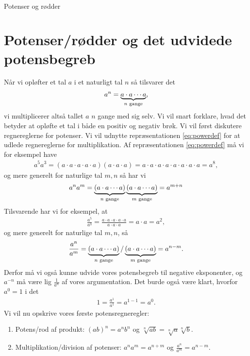 

\begin{center}
\Huge
Potenser og rødder
\end{center}


\section*{Potenser/rødder og det udvidede potensbegreb}

Når vi opløfter et tal $a$ i et naturligt tal $n$ så tilsvarer det
\begin{align}\label{eq:powerdef}
a^n = \underbrace{a\cdot a \cdots a}_{n\textnormal{ gange}},
\end{align}
vi multiplicerer altså tallet $a$ $n$ gange med sig selv. Vi vil snart forklare, hvad det betyder at opløfte et tal i både en positiv og negativ brøk. Vi vil først diskutere regnereglerne for potenser. Vi vil udnytte repræsentationen \eqref{eq:powerdef} for at udlede regnereglerne for multiplikation.
Af repræsentationen \eqref{eq:powerdef} må vi for eksempel have
\begin{align*}
a^5a^3 = (a\cdot a\cdot a\cdot a\cdot a)(a\cdot a\cdot a) = a\cdot a\cdot a\cdot a\cdot a\cdot a\cdot a\cdot a = a^8, 
\end{align*}
og mere generelt for naturlige tal $m,n$ så har vi
\begin{align*}
a^na^m = \underbrace{(a\cdot a\cdots a)}_{n \textnormal{ gange}}\underbrace{(a\cdot a\cdots a)}_{m \textnormal{ gange}} = a^{m+n}
\end{align*}
Tilsvarende har vi for eksempel, at 
\begin{align*}
\frac{a^5}{a^3} = \frac{a\cdot a\cdot a\cdot a\cdot a}{a\cdot a\cdot a} = a\cdot a =a^2,
\end{align*}
og mere generelt for naturlige tal $m,n$, så
\begin{align*}
\frac{a^n}{a^m} = \underbrace{(a \cdot a \cdots a)}_{n\textnormal{ gange}}/\underbrace{(a \cdot a \cdots a)}_{m\textnormal{ gange}} = a^{n-m}.
\end{align*}
Derfor må vi også kunne udvide vores potensbegreb til negative eksponenter, og $a^{-n}$ må være lig $\frac{1}{a^n}$ af vores argumentation. Det burde også være klart, hvorfor $a^0 =1$ i det 
\begin{align*}
1 = \frac{a^{1}}{a^{1}} = a^{1-1} = a^0.
\end{align*}
Vi vil nu opskrive vores første potensregneregler:
\begin{enumerate}[label=\roman*)]
\item Potens/rod af produkt: $(ab)^n =a^nb^n $ og $\sqrt[n]{ab} = \sqrt[n]{a}\sqrt[n]{b}$.
\item Multiplikation/division af potenser: $a^na^m = a^{n+m}$ og $\frac{a^n}{a^m} = a^{n-m}$.
\end{enumerate}
